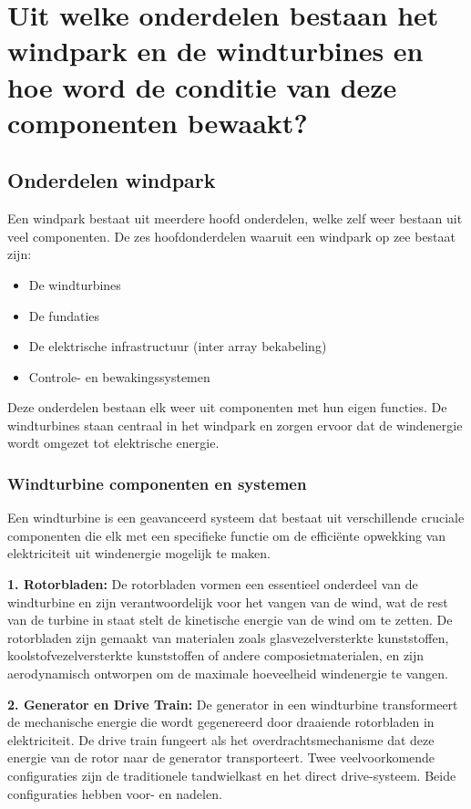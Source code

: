 \section{Uit welke onderdelen bestaan het windpark en de windturbines en hoe word de conditie van deze componenten bewaakt?}
\subsection{Onderdelen windpark}
Een windpark bestaat uit meerdere hoofd onderdelen, welke zelf weer bestaan uit veel componenten. De zes hoofdonderdelen waaruit een windpark op zee bestaat zijn\cite{Eneco_presentatie}: 
\begin{itemize}
    \item De windturbines
    \item De fundaties
    \item De elektrische infrastructuur (inter array bekabeling)
    \item Controle- en bewakingssystemen
\end{itemize}
Deze onderdelen bestaan elk weer uit componenten met hun eigen functies. 
De windturbines staan centraal in het windpark en zorgen ervoor dat de windenergie wordt omgezet tot elektrische energie. 
 
\subsubsection{Windturbine componenten en systemen}
Een windturbine is een geavanceerd systeem dat bestaat uit verschillende cruciale componenten die elk met een specifieke functie om de efficiënte opwekking van elektriciteit uit windenergie mogelijk te maken.

\textbf{1. Rotorbladen:}
De rotorbladen vormen een essentieel onderdeel van de windturbine en zijn verantwoordelijk voor het vangen van de wind, wat de rest van de turbine in staat stelt de kinetische energie van de wind om te zetten. De rotorbladen zijn gemaakt van materialen zoals glasvezelversterkte kunststoffen, koolstofvezelversterkte kunststoffen of andere composietmaterialen, en zijn aerodynamisch ontworpen om de maximale hoeveelheid windenergie te vangen.\cite{Rotorbladen}\cite{Rotorbladen_windturbinecomponenten}

\textbf{2. Generator en Drive Train:}
De generator in een windturbine transformeert de mechanische energie die wordt gegenereerd door draaiende rotorbladen in elektriciteit. De drive train fungeert als het overdrachtsmechanisme dat deze energie van de rotor naar de generator transporteert. Twee veelvoorkomende configuraties zijn de traditionele tandwielkast en het direct drive-systeem. Beide configuraties hebben voor- en nadelen.\cite{Huygens_Engineers_presentatie}

